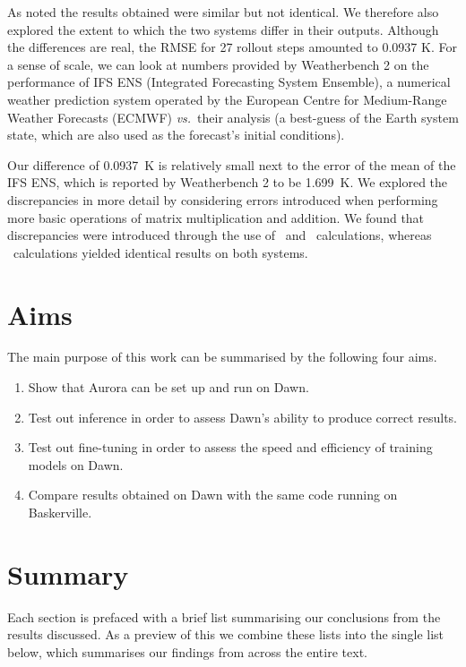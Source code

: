 As noted the results obtained were similar but not identical. We therefore also explored the extent to which the two systems differ in their outputs. Although the differences are real, the RMSE for 27 rollout steps amounted to 0.0937 K.  For a sense of scale, we can look at numbers provided by Weatherbench 2 \cite{rasp2024weatherbench2benchmarkgeneration} on the performance of IFS ENS (Integrated Forecasting System Ensemble), a numerical weather prediction system operated by the European Centre for Medium-Range Weather Forecasts (ECMWF) \textit{vs.}\ their analysis (a best-guess of the Earth system state, which are also used as the forecast's initial conditions).

Our difference of \qty{0.0937}{\kelvin} is relatively small next to the error of the mean of the IFS ENS, which is reported by Weatherbench 2 to be \qty{1.699}{\kelvin}. We explored the discrepancies in more detail by considering errors introduced when performing more basic operations of matrix multiplication and addition. We found that discrepancies were introduced through the use of \fphalf\ and \fpdouble\ calculations, whereas \bfhalf\ calculations yielded identical results on both systems.

\section{Aims}

The main purpose of this work can be summarised by the following four aims.

\begin{enumerate}
\item Show that Aurora can be set up and run on Dawn.
\item Test out inference in order to assess Dawn's ability to produce correct results.
\item Test out fine-tuning in order to assess the speed and efficiency of training models on Dawn.
\item Compare results obtained on Dawn with the same code running on Baskerville.
\end{enumerate}

\section{Summary}

Each section is prefaced with a brief list summarising our conclusions from the results discussed. As a preview of this we combine these lists into the single list below, which summarises our findings from across the entire text.

